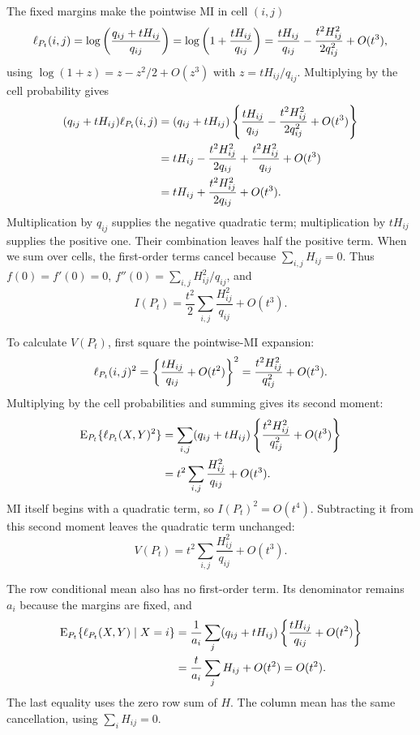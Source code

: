 The fixed margins make the pointwise MI in cell \((i,j)\)
\begin{equation}
 \ell_{P_t}(i,j)
 =\log\left(\frac{q_{ij}+tH_{ij}}{q_{ij}}\right)
 =\log\left(1+\frac{tH_{ij}}{q_{ij}}\right)
 =\frac{tH_{ij}}{q_{ij}}-
  \frac{t^2H_{ij}^2}{2q_{ij}^2}+O(t^3),
\end{equation}
using \(\log(1+z)=z-z^2/2+O(z^3)\) with
\(z=tH_{ij}/q_{ij}\). Multiplying by the cell probability gives
\begin{align*}
 (q_{ij}+tH_{ij})\ell_{P_t}(i,j)
 &=(q_{ij}+tH_{ij})
   \left\{\frac{tH_{ij}}{q_{ij}}
    -\frac{t^2H_{ij}^2}{2q_{ij}^2}+O(t^3)\right\}\\*
 &=tH_{ij}-\frac{t^2H_{ij}^2}{2q_{ij}}
   +\frac{t^2H_{ij}^2}{q_{ij}}+O(t^3)\\*
 &=tH_{ij}+\frac{t^2H_{ij}^2}{2q_{ij}}+O(t^3).
\end{align*}
Multiplication by \(q_{ij}\) supplies the negative quadratic term;
multiplication by \(tH_{ij}\) supplies the positive one. Their combination
leaves half the positive term. When we sum over cells, the first-order
terms cancel because \(\sum_{i,j}H_{ij}=0\).
Thus \(f(0)=f'(0)=0\), \(f''(0)=\sum_{i,j}H_{ij}^2/q_{ij}\), and
\begin{equation}
 I(P_t)=\frac{t^2}{2}\sum_{i,j}\frac{H_{ij}^2}{q_{ij}}+O(t^3).
\end{equation}

To calculate \(V(P_t)\), first square the pointwise-MI expansion:
\begin{equation*}
 \ell_{P_t}(i,j)^2
 =\left\{\frac{tH_{ij}}{q_{ij}}+O(t^2)\right\}^2
 =\frac{t^2H_{ij}^2}{q_{ij}^2}+O(t^3).
\end{equation*}
Multiplying by the cell probabilities and summing gives its second moment:
\begin{align*}
 \operatorname{E}_{P_t}\{\ell_{P_t}(X,Y)^2\}
 &=\sum_{i,j}(q_{ij}+tH_{ij})
    \left\{\frac{t^2H_{ij}^2}{q_{ij}^2}+O(t^3)\right\}\\*
 &=t^2\sum_{i,j}\frac{H_{ij}^2}{q_{ij}}+O(t^3).
\end{align*}
MI itself begins with a quadratic term, so \(I(P_t)^2=O(t^4)\).
Subtracting it from this second moment leaves the quadratic term unchanged:
\begin{equation}
 V(P_t)=t^2\sum_{i,j}\frac{H_{ij}^2}{q_{ij}}+O(t^3).
\end{equation}

The row conditional mean also has no first-order term. Its denominator
remains \(a_i\) because the margins are fixed, and
\begin{align*}
 \operatorname{E}_{P_t}\{\ell_{P_t}(X,Y)\mid X=i\}
 &=\frac{1}{a_i}\sum_j(q_{ij}+tH_{ij})
   \left\{\frac{tH_{ij}}{q_{ij}}+O(t^2)\right\}\\*
 &=\frac{t}{a_i}\sum_jH_{ij}+O(t^2)
 =O(t^2).
\end{align*}
The last equality uses the zero row sum of \(H\). The column mean has the
same cancellation, using \(\sum_iH_{ij}=0\).

